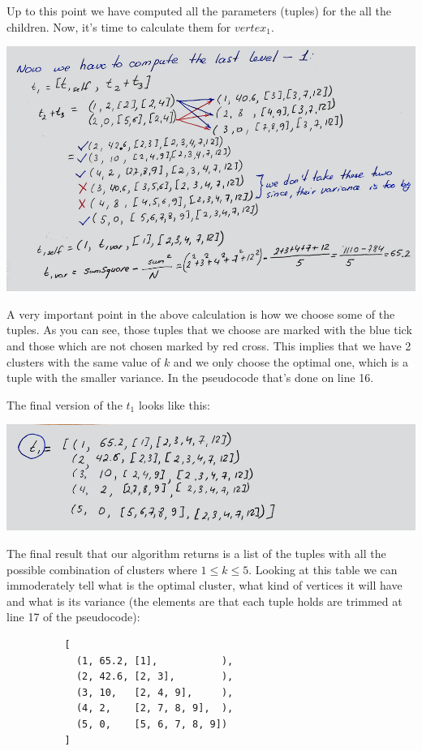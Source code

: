 \documentclass[11pt,a4paper,english]{article}
\begin{document}
        Up to this point we have computed all the parameters (tuples) for the all the children. Now, it's time to calculate them for $vertex_1$.
        \begin{center}
          \includegraphics[width=15cm]{sc_6.png}
        \end{center}
        A very important point in the above calculation is how we choose some of the tuples. As you can see, those tuples that we choose are marked with the blue tick and those which are not chosen marked by red cross. This implies that we have 2 clusters with the same value of $k$ and we only choose the optimal one, which is a tuple with the smaller variance. In the pseudocode that's done on line 16.

        The final version of the $t_1$ looks like this:
        \begin{center}
          \includegraphics[width=15cm]{sc_7.png}
        \end{center}

        The final result that our algorithm returns is a list of the tuples with all the possible combination of clusters where $1 \leq k \leq 5$. Looking at this table we can immoderately tell what is the optimal cluster, what kind of vertices it will have and what is its variance (the elements are that each tuple holds are trimmed at line 17 of the pseudocode):
        \begin{verbatim}
          [
            (1, 65.2, [1],           ),
            (2, 42.6, [2, 3],        ),
            (3, 10,   [2, 4, 9],     ),
            (4, 2,    [2, 7, 8, 9],  ),
            (5, 0,    [5, 6, 7, 8, 9])
          ]
        \end{verbatim}
\end{document}
